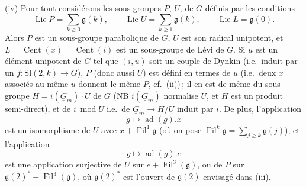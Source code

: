 \documentclass[11pt,a4paper]{article}
\begin{document}
(iv) Pour tout   considérons les sous-groupes $P$, $U$,  de $G$
définis par les conditions
\[
  \operatorname{Lie}P=\sum_{k\geqslant 0}\mathfrak{g}(k),\qquad
  \operatorname{Lie}U=\sum_{k\geqslant 1}\mathfrak{g}(k),\qquad
  \operatorname{Lie}L=\mathfrak{g}(0).
\]
Alors $P$ est un sous-groupe parabolique de $G$, $U$ est son radical
unipotent, et $L=\operatorname{Cent}(x)=\operatorname{Cent}(i)$ est un
sous-groupe de Lévi de $G$. Si $u$  est un élément unipotent
de $G$ tel que $(i,u)$ soit un couple de Dynkin (i.e.\ induit par un
$f\colon\mathrm{Sl}(2,k)\to G$), $P$ (donc aussi $U$) est défini en termes de
$u$ (i.e.\ deux $x$ associés au même $u$ donnent le même $P$, cf.\ (ii))\,; il
en est de même du sous-groupe $H=i(\underline{G}_m)\cdot U$ de $G$ (NB
$i(\underline{G}_m)$ normalise $U$, et $H$ est un produit semi-direct), et de
$i\ \operatorname{mod}U$ i.e.\ de $\underline{G}_m\to H/U$ induit par $i$. De
plus, l'application
\[
  g\longmapsto\operatorname{ad}(g).x
\]
est un isomorphisme de $U$ avec $x+\operatorname{Fil}^{1}\mathfrak{g}$
 (où on pose $\operatorname{Fil}^{k}
\mathfrak{g}=\sum_{j\geqslant k}\mathfrak{g}(j)$), et l'application
\[
  g\longmapsto\operatorname{ad}(g).e
\]
est une application surjective de $U$ sur $e+\operatorname{Fil}^{3}
(\mathfrak{g})$, ou de $P$ sur $\mathfrak{g}(2)^{*}+\operatorname{Fil}^{3}
(\mathfrak{g})$, où $\mathfrak{g}(2)^{*}$ est l'ouvert de $\mathfrak{g}(2)$
envisagé dans (iii).
\end{document}
